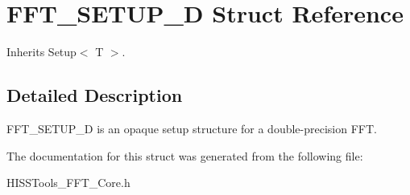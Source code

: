 \hypertarget{struct_double_setup}{}\section{F\+F\+T\+\_\+\+S\+E\+T\+U\+P\+\_\+D Struct Reference}
\label{struct_double_setup}


Inherits Setup$<$ T $>$.



\subsection{Detailed Description}
F\+F\+T\+\_\+\+S\+E\+T\+U\+P\+\_\+D is an opaque setup structure for a double-\/precision F\+FT. 

The documentation for this struct was generated from the following file\+:\begin{DoxyCompactItemize}
\item 
H\+I\+S\+S\+Tools\+\_\+\+F\+F\+T\+\_\+\+Core.\+h\end{DoxyCompactItemize}
